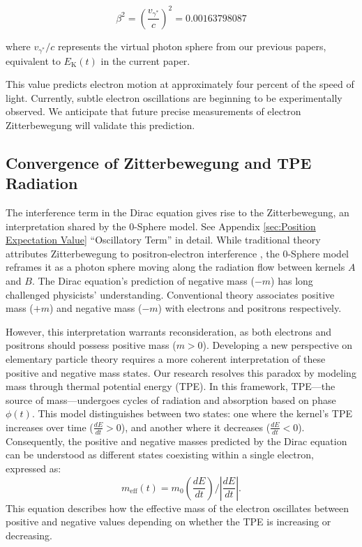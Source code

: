 \documentclass[%
 reprint,
 amsmath,amssymb,
 aps,
]{revtex4-1}
\numberwithin{equation}{section}%
\begin{document}
\begin{equation}
    \beta^2 = (\frac{v_{\gamma^{*}}}{c})^2 = 0.00163798087
\end{equation}

where $v_{\gamma^{*}}/c$ represents the virtual photon sphere from our previous papers, equivalent to $E_{\mathrm{K}}(t)$ in the current paper.

This value predicts electron motion at approximately four percent of the speed of light. Currently, subtle electron oscillations are beginning to be experimentally observed. We anticipate that future precise measurements of electron Zitterbewegung will validate this prediction.


\subsection{\label{sec:Convergence of Zitterbewgung}Convergence of Zitterbewegung and TPE Radiation}

The interference term in the Dirac equation gives rise to the Zitterbewegung, an interpretation shared by the 0-Sphere model. See Appendix \ref{sec:Position Expectation Value} ``Oscillatory Term'' in detail. While traditional theory attributes Zitterbewegung to positron-electron interference \cite{barut1981, hestenes1990}, the 0-Sphere model reframes it as a photon sphere moving along the radiation flow between kernels $A$ and $B$.
The Dirac equation's prediction of negative mass ($-m$) has long challenged physicists' understanding. Conventional theory associates positive mass ($+m$) and negative mass ($-m$) with electrons and positrons respectively.

However, this interpretation warrants reconsideration, as both electrons and positrons should possess positive mass ($m > 0$). Developing a new perspective on elementary particle theory requires a more coherent interpretation of these positive and negative mass states.
Our research resolves this paradox by modeling mass through thermal potential energy (TPE). In this framework, TPE—the source of mass—undergoes cycles of radiation and absorption based on phase $\phi(t)$. This model distinguishes between two states: one where the kernel's TPE increases over time ($\frac{dE}{dt} > 0$), and another where it decreases ($\frac{dE}{dt} < 0$). Consequently, the positive and negative masses predicted by the Dirac equation can be understood as different states coexisting within a single electron, expressed as:
\begin{equation}
m_{\text{eff}}(t) = m_0\left(\frac{dE}{dt}\right)/\left|\frac{dE}{dt}\right|.
\end{equation}
This equation describes how the effective mass of the electron oscillates between positive and negative values depending on whether the TPE is increasing or decreasing.
\end{document}
